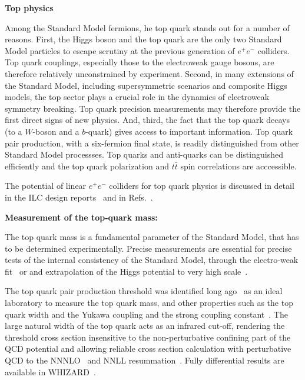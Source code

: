 {\bf Top physics}

Among the Standard Model fermions, he top quark stands out for a number of reasons. First, the Higgs boson
and the top quark are the only two Standard Model particles to escape scrutiny at the previous generation
of $e^+e^-$ colliders. Top quark couplings, especially those to the electroweak gauge bosons, are therefore
relatively unconstrained by experiment. Second, in many extensions of the Standard Model, including
supersymmetric scenarios and composite Higgs models, the top sector plays a crucial role in the dynamics
of electroweak symmetry breaking. Top quark precision measurements may therefore provide the first direct signs of new physics.
And, third, the fact that the top quark decays (to a $W$-boson and a $b$-quark) gives access to important information. Top quark
pair production, with a six-fermion final state, is readily distinguished from other Standard Model processses. Top quarks
and anti-quarks can be distinguished efficiently and the top quark polarization and $t\bar{t}$ spin correlations are acccessible. 

The potential of linear $e^+e^-$ colliders for top quark physics is discussed in detail in the ILC design reports~\cite{}
and in Refs.~\cite{Agashe:2013hma,Vos:2016til,Abramowicz:2018rjq}.

{\bf Measurement of the top-quark mass:}

The top quark mass is a fundamental parameter of the Standard Model, that has to be
determined experimentally. Precise measurements are essential for precise tests of
the internal consistency of the Standard Model, through the electro-weak
fit~\cite{Baak:2014ora} or and extrapolation of the Higgs potential to very high
scale~\cite{Degrassi:2012ry}.

The top quark pair production threshold was identified long ago~\cite{Gusken:1985nf} as
an ideal laboratory to measure the top quark mass, and other properties such as the top quark
width and the Yukawa coupling and the strong coupling constant~\cite{Strassler:1990nw}.
The large natural width of the top quark acts as an infrared cut-off,
rendering the threshold cross section insensitive to the non-perturbative confining part
of the QCD potential and allowing reliable cross section calculation with perturbative QCD
to the NNNLO~\cite{Beneke:2015kwa} and NNLL resummation~\cite{Hoang:2013uda}. Fully
differential results are available in WHIZARD~\cite{Bach:2017ggt}.

